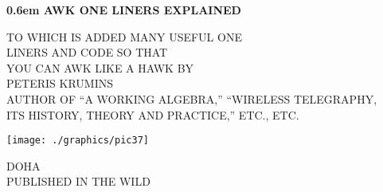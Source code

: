 \newcommand\nbvspace[1][3]{\vspace*{\stretch{#1}}}
\newcommand\nbstretchyspace{\spaceskip0.5em plus 0.25em minus 0.25em}
\newcommand{\nbtitlestretch}{\spaceskip0.6em}
\pagestyle{empty}
\begin{center}
	\bfseries
	\nbvspace[1]
	\Huge
	{\nbtitlestretch\huge
		AWK ONE LINERS EXPLAINED}
	
	\nbvspace[1]
	\normalsize
	
	TO WHICH IS ADDED MANY USEFUL ONE\\
	LINERS AND CODE SO THAT\\
	YOU CAN AWK LIKE A HAWK
	\nbvspace[1]
	\small BY\\
	\Large PETERIS KRUMINS\\[0.5em]
	\footnotesize AUTHOR OF ``A WORKING ALGEBRA,'' ``WIRELESS TELEGRAPHY,\\
	ITS HISTORY, THEORY AND PRACTICE,'' ETC., ETC.
	
	\nbvspace[2]
	
	\texttt{[image: ./graphics/pic37]}
	\nbvspace[3]
	\normalsize
	
	DOHA\\
	\large
	PUBLISHED IN THE WILD
	\nbvspace[1]
\end{center}
